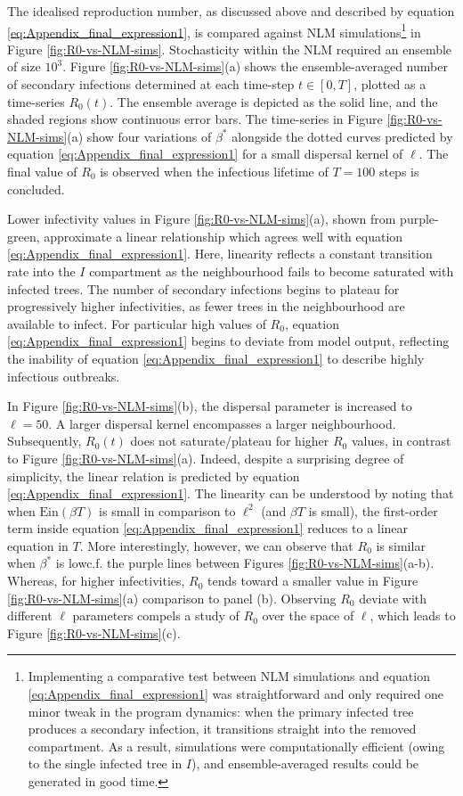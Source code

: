 The idealised reproduction number, as discussed above and described by equation \ref{eq:Appendix_final_expression1}, is compared against NLM simulations\footnote{Implementing a comparative test between NLM simulations and equation \ref{eq:Appendix_final_expression1} was straightforward and only required one minor tweak in the program dynamics: when the primary infected tree produces a secondary infection, it transitions straight into the removed compartment. As a result, simulations were computationally efficient (owing to the single infected tree in $I$), and ensemble-averaged results could be generated in good time.} in Figure \ref{fig:R0-vs-NLM-sims}.
Stochasticity within the NLM required an ensemble of size $10^3$.
Figure \ref{fig:R0-vs-NLM-sims}(a) shows the ensemble-averaged number of secondary infections determined at each time-step $t\in [0, T]$, plotted as a time-series $R_0(t)$.
The ensemble average is depicted as the solid line, and the shaded regions show continuous error bars.
The time-series in Figure \ref{fig:R0-vs-NLM-sims}(a) show four variations of $\beta^*$ alongside the dotted curves predicted by equation \ref{eq:Appendix_final_expression1} for a small dispersal kernel of $\ell$. 
The final value of $R_0$ is observed when the infectious lifetime of $T=100$ steps is concluded. 

Lower infectivity values in Figure \ref{fig:R0-vs-NLM-sims}(a), shown from purple-green, approximate a linear relationship which agrees well with equation \ref{eq:Appendix_final_expression1}.
Here, linearity reflects a constant transition rate into the $I$ compartment as the neighbourhood fails to become saturated with infected trees. 
The number of secondary infections begins to plateau for progressively higher infectivities, as fewer trees in the neighbourhood are available to infect.
For particular high values of $R_0$, equation \ref{eq:Appendix_final_expression1} begins to deviate from model output, reflecting the inability of equation \ref{eq:Appendix_final_expression1}
to describe highly infectious outbreaks.

In Figure \ref{fig:R0-vs-NLM-sims}(b), the dispersal parameter is increased to $\ell=50$.
A larger dispersal kernel encompasses a larger neighbourhood.
Subsequently, $R_0(t)$ does not saturate/plateau for higher $R_0$ values, in contrast to Figure \ref{fig:R0-vs-NLM-sims}(a).
Indeed, despite a surprising degree of simplicity, the linear relation is predicted by equation \ref{eq:Appendix_final_expression1}.
The linearity can be understood by noting that when $\mathrm{Ein}(\beta T)$ is small in comparison to $\ell^2$ (and $\beta T$ is small), the first-order term inside equation \ref{eq:Appendix_final_expression1} reduces to a linear equation in $T$.
More interestingly, however, we can observe that $R_0$ is similar when $\beta^*$ is low\textemdash c.f. the purple lines between Figures \ref{fig:R0-vs-NLM-sims}(a-b).
Whereas, for higher infectivities, $R_0$ tends toward a smaller value in Figure \ref{fig:R0-vs-NLM-sims}(a) comparison to panel (b).
Observing $R_0$ deviate with different $\ell$ parameters compels a study of $R_0$ over the space of $\ell$, which leads to Figure \ref{fig:R0-vs-NLM-sims}(c).

